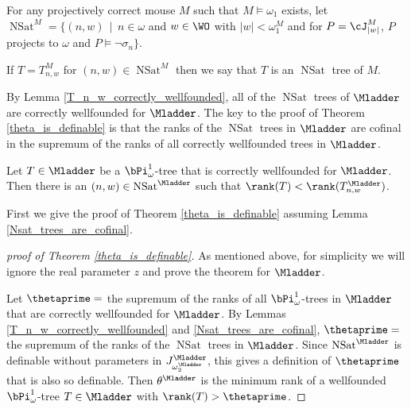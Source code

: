 \documentclass[oneside,12pt]{amsart}
\DeclareMathOperator{\NSat}{NSat}
\begin{document}
\begin{definition}
For any projectively correct mouse $M$ such that $M\models \omega_1$ exists,
let $\NSat^M=\big\{ (n,w) \, \mid \, n\in\omega$ and $w\in\WO$ with $|w|<\omega_1^{M}$ and
for $P=\cJ^M_{|w|}$, $P$ projects to $\omega$ and $P\models \neg \sigma_n \big\}$.

If $T=T^M_{n,w}$ for $(n,w)\in\NSat^M$ then we say that $T$ is an $\NSat$ tree of $M$.
\end{definition}

By Lemma \ref{T_n_w_correctly_wellfounded}, all of the $\NSat$ trees of $\Mladder$
are correctly wellfounded for $\Mladder$. The key to the proof of Theorem
 \ref{theta_is_definable} is that the ranks of the $\NSat$ trees in $\Mladder$ are cofinal
 in the supremum of the ranks of all correctly wellfounded trees in $\Mladder$.

\begin{lemma}
\label{Nsat_trees_are_cofinal}
Let $T\in\Mladder$ be a $\bPi^1_{\omega}$-tree that is correctly wellfounded for $\Mladder$.
Then there is an $(n,w)\in \NSat^{\Mladder}$ such that $\rank(T) < \rank(T^{\Mladder}_{n,w})$.
\end{lemma}

First we give the proof of Theorem \ref{theta_is_definable} assuming Lemma
\ref{Nsat_trees_are_cofinal}.

\begin{proof}[proof of Theorem \ref{theta_is_definable}]
As mentioned above, for simplicity we will ignore the real parameter $z$ and prove
the theorem for $\Mladder$.

Let $\thetaprime = $ the supremum of the ranks of all $\bPi^1_{\omega}$-trees
in $\Mladder$ that are correctly wellfounded for $\Mladder$. By Lemmas
\ref{T_n_w_correctly_wellfounded} and \ref{Nsat_trees_are_cofinal}, $\thetaprime =$
the supremum of the ranks of the $\NSat$ trees in $\Mladder$.
Since $\NSat^{\Mladder}$
is definable without parameters in $J^{\Mladder}_{\omega_2^{\Mladder}}$,
this gives a definition of $\thetaprime$ that is also
so definable. Then $\theta^{\Mladder}$ is the minimum rank of a wellfounded
$\bPi^1_{\omega}$-tree $T\in\Mladder$ with $\rank(T)>\thetaprime$.
\end{proof}
\end{document}
